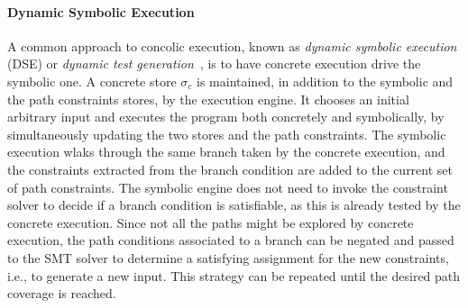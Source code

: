 \newcommand{\dse}{DSE}
\paragraph{Dynamic Symbolic Execution} A common approach to concolic execution, known as {\em dynamic symbolic execution} (\dse) or {\em dynamic test  generation}~\cite{DART-PLDI05}, is to have concrete execution drive the symbolic one. A concrete store $\sigma_c$ is maintained, in addition to the symbolic and the path constraints stores, by the execution engine. It chooses an initial arbitrary input and executes the program both concretely and symbolically, by simultaneously updating the two stores and the path constraints. The symbolic execution wlaks through the same branch taken by the concrete execution, and the constraints extracted from the branch condition are added to the current set of path constraints. The symbolic engine does not need to invoke the constraint solver to decide if a branch condition is satisfiable, as this is already tested by the concrete execution. Since not all the paths might be explored by concrete execution, the path conditions associated to a branch can be negated and passed to the SMT solver to determine a satisfying assignment for the new constraints, i.e., to generate a new input. This strategy can be repeated until the desired path coverage is reached.

